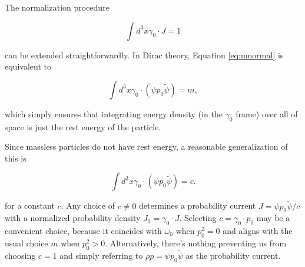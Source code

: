 \documentclass{article}
\begin{document}
  The normalization procedure

  \begin{equation}
    \int d^3x \gamma_0 \cdot J = 1\label{eq:mnormal}
  \end{equation}

  can be extended straightforwardly. In Dirac theory, Equation \ref{eq:mnormal} is equivalent to

  \begin{equation}
    \int d^3x \gamma_0 \cdot (\psi p_0 \widetilde \psi) = m,
  \end{equation}

  which simply ensures that integrating energy density (in the $\gamma_0$ frame) over all of space is just the rest energy of the particle.

  Since massless particles do not have rest energy, a reasonable generalization of this is

  \begin{equation}
    \int d^3x \gamma_0 \cdot (\psi p_0 \widetilde \psi) = c. \label{eq:normalization}
  \end{equation}

  for a constant $c$. Any choice of $c \not= 0$ determines a probability current $J = \psi p_0 \widetilde \psi / c$ with a normalized probability density $J_0 = \gamma_0 \cdot J$. Selecting $c = \gamma_0 \cdot p_0$ may be a convenient choice, because it coincides with $\omega_0$ when $p_0^2 = 0$ and aligns with the usual choice $m$ when $p_0^2 > 0$. Alternatively, there's nothing preventing us from choosing $c = 1$ and simply referring to $\rho p = \psi p_0 \widetilde \psi$ as the probability current.




\end{document}
